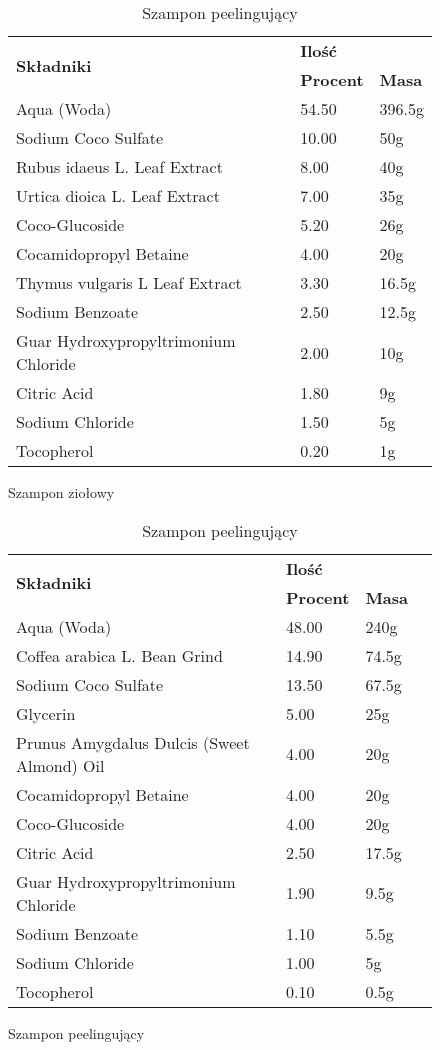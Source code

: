 \begin{table}[H]
\centering
	\caption{(a) i (b) składy poszczególnych szamponów. (c), (d) i (e) składy poszczególnych odżywek}
\begin{footnotesize}
	\begin{subfigure}[t]{0.45\textwidth}
		\centering
		\caption{Szampon ziołowy}
		\begin{tabular}{p{}ll}
			\hline
			\multirow{2}{*}{\textbf{Składniki}} & \multicolumn{2}{l}{\textbf{Ilość}} \\
			\cline{2-3}
			& \textbf{Procent} & \textbf{Masa} \\
			\hline\hline
			Aqua (Woda) & 54.50 & 396.5g  \\
			Sodium Coco Sulfate & 10.00 & 50g  \\
			Rubus idaeus L. Leaf Extract & 8.00 & 40g  \\
			Urtica dioica L. Leaf Extract & 7.00 & 35g  \\
			Coco-Glucoside & 5.20 & 26g  \\
			Cocamidopropyl Betaine & 4.00 & 20g  \\
			Thymus vulgaris L Leaf Extract & 3.30 & 16.5g  \\
			Sodium Benzoate & 2.50 & 12.5g  \\
			Guar Hydroxypropyltrimonium Chloride & 2.00 & 10g  \\
			Citric Acid & 1.80 & 9g  \\
			Sodium Chloride & 1.50 & 5g  \\
			Tocopherol & 0.20 & 1g  \\
			\hline
		\end{tabular}
	\end{subfigure}
	\begin{subfigure}[t]{0.5\textwidth}
		\centering
		\caption{Szampon peelingujący}
		\begin{tabular}{p{}lll}
			\hline
			\multirow{2}{*}{\textbf{Składniki}} & \multicolumn{2}{l}{\textbf{Ilość}} \\
			\cline{2-3}
			& \textbf{Procent} & \textbf{Masa}  \\
			\hline\hline
			Aqua (Woda) & 48.00 & 240g  \\
			Coffea arabica L. Bean Grind & 14.90 & 74.5g  \\
			Sodium Coco Sulfate & 13.50 & 67.5g  \\
			Glycerin & 5.00 & 25g  \\
			Prunus Amygdalus Dulcis (Sweet Almond) Oil & 4.00 & 20g  \\
			Cocamidopropyl Betaine & 4.00 & 20g  \\
			Coco-Glucoside & 4.00 & 20g  \\
			Citric Acid & 2.50 & 17.5g  \\
			Guar Hydroxypropyltrimonium Chloride & 1.90 & 9.5g  \\
			Sodium Benzoate & 1.10 & 5.5g  \\
			Sodium Chloride & 1.00 & 5g \\
			Tocopherol & 0.10 & 0.5g  \\
			\hline
		\end{tabular}
	\end{subfigure}


\end{footnotesize}
\end{table}
